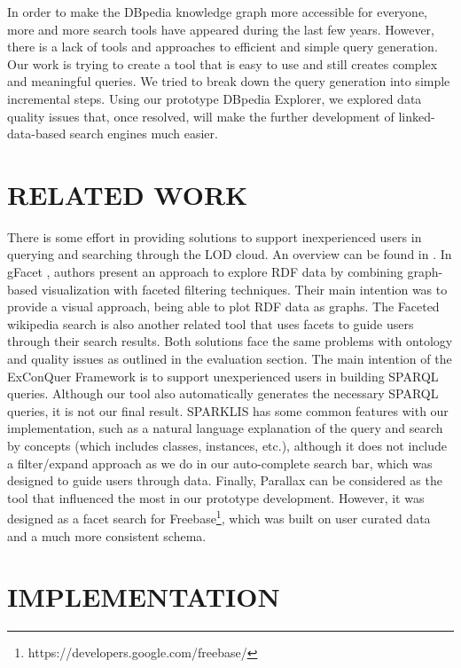 \documentclass{sig-alternate}
\begin{document}
In order to make the DBpedia knowledge graph more accessible for everyone, more and more search tools have appeared during the last few years. However, there is a lack of tools and approaches to eﬃcient and simple query generation. Our work is trying to create a tool that is easy to use and still creates complex and meaningful queries. We tried to break down the query generation into simple incremental steps. Using our prototype DBpedia Explorer, we explored data quality issues that, once resolved, will make the further development of linked-data-based search engines much easier.

\section{RELATED WORK}

There is some eﬀort in providing solutions to support inexperienced users in querying and searching through the LOD cloud. An overview can be found in  \cite{_Ref490639265} \cite{_Ref490639271}. In gFacet  \cite{_Ref490639311}, authors present an approach to explore RDF data by combining graph-based visualization with faceted ﬁltering techniques. Their main intention was to provide a visual approach, being able to plot RDF data as graphs. The Faceted wikipedia search  \cite{_Ref490639358} is also another related tool that uses facets to guide users through their search results. Both solutions face the same problems with ontology and quality issues as outlined in the evaluation section. The main intention of the ExConQuer Framework  \cite{_Ref490639203} is to support unexperienced users in building SPARQL queries. Although our tool also automatically generates the necessary SPARQL queries, it is not our ﬁnal result. SPARKLIS  \cite{_Ref490639375} has some common features with our implementation, such as a natural language explanation of the query and search by concepts (which includes classes, instances, etc.), although it does not include a ﬁlter/expand approach as we do in our auto-complete search bar, which was designed to guide users through data. Finally, Parallax  \cite{_Ref490639388} can be considered as the tool that inﬂuenced the most in our prototype development. However, it was designed as a facet search for Freebase\footnote{ https://developers.google.com/freebase/}, which was built on user curated data and a much more consistent schema.

\section{IMPLEMENTATION}
\end{document}
